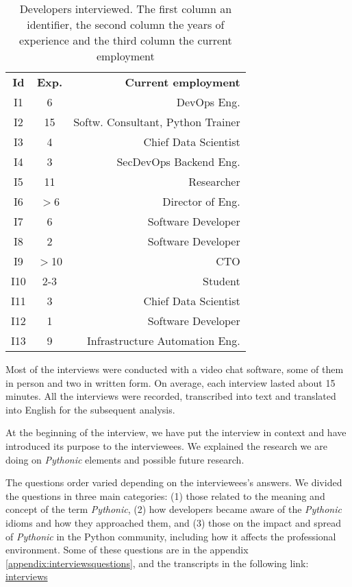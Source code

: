 \documentclass[a4paper]{article}
\begin{document}
\begin{table}
    \centering
    \begin{tabular}{c c r}
        
        \textbf{Id} & \textbf{Exp.} & \textbf{Current employment} \\
        
        I1 &  6 & DevOps Eng. \\
        I2 & 15 & Softw. Consultant, Python Trainer \\
        I3 &  4 & Chief Data Scientist \\
        I4 &  3 & SecDevOps Backend Eng. \\
        I5 & 11 & Researcher \\
        I6 & $>$6 & Director of Eng. \\
        I7 &  6 & Software Developer \\
        I8 &  2  & Software Developer \\
        I9 & $>$10 & CTO \\
        I10 & 2-3 & Student \\
        I11 & 3 & Chief Data Scientist \\
        I12 & 1 & Software Developer \\
        I13 & 9 & Infrastructure Automation Eng. \\ 
    \end{tabular}
    \caption{Developers interviewed. The first column an identifier, the second column the years of experience and the third column the current employment}
    \label{tab:interviewees}
\end{table}

Most of the interviews were conducted with a video chat software, some of them in person and two in written form. On average, each interview lasted about 15 minutes. All the interviews were recorded, transcribed into text and translated into English for the subsequent analysis.

At the beginning of the interview, we have put the interview in context and have introduced its purpose to the interviewees. We explained the research we are doing on \textit{Pythonic} elements and possible future research.

The questions order varied depending on the interviewees's answers. We divided the questions in three main categories: (1) those related to
the meaning and concept of the term \textit{Pythonic}, (2) how developers became aware of the \textit{Pythonic} idioms and how they approached them, and (3) those on the impact and spread of \textit{Pythonic} in the Python community, including how it affects the professional environment. Some of these questions are in the appendix \ref{appendix:interviewsquestions}, and the transcripts in the following link: \href{https://docs.google.com/document/d/12Nj3KJ1kKRU7iL8-fpyUseAxcgGGJhb8EtxE6u6XUZM/edit?usp=sharing}{interviews}
\end{document}
